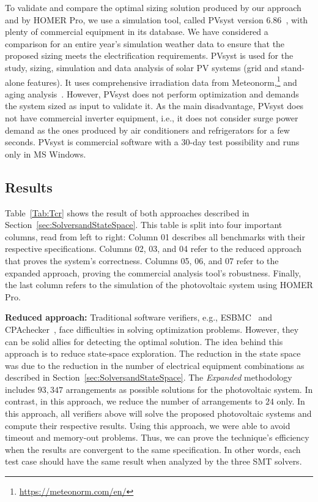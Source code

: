 \documentclass[journal]{IEEEtran}
\begin{document}
To validate and compare the optimal sizing solution produced by our approach and by HOMER Pro, we use a simulation tool, called PVsyst version $6.86$~\cite{PVsyst}, with plenty of commercial equipment in its database. We have considered a comparison for an entire year's simulation weather data to ensure that the proposed sizing meets the electrification requirements. PVsyst is used for the study, sizing, simulation and data analysis of solar PV systems (grid and stand-alone features). It uses comprehensive irradiation data from Meteonorm,\footnote{\href{https://meteonorm.com/en/}{https://meteonorm.com/en/}} and aging analysis~\cite{PVsyst2017}. However, PVsyst does not perform optimization and demands the system sized as input to validate it. As the main disadvantage, PVsyst does not have commercial inverter equipment, i.e., it does not consider surge power demand as the ones produced by air conditioners and refrigerators for a few seconds. PVsyst is commercial software with a $30$-day test possibility and runs only in MS Windows.

\subsection{Results}

Table~\ref{Tab:Tcr} shows the result of both approaches described in Section~\ref{sec:SolversandStateSpace}. This table is split into four important columns, read from left to right: Column 01 describes all benchmarks with their respective specifications. Columns 02, 03, and 04 refer to the reduced approach that proves the system's correctness. Columns 05, 06, and 07 refer to the expanded approach, proving the commercial analysis tool's robustness. Finally, the last column refers to the simulation of the photovoltaic system using HOMER Pro.

\textbf{Reduced approach:} Traditional software verifiers, e.g., ESBMC~\cite{esbmc2018} and CPAchecker~\cite{Beyer2011}, face difficulties in solving optimization problems. However, they can be solid allies for detecting the optimal solution. The idea behind this approach is to reduce state-space exploration. The reduction in the state space was due to the reduction in the number of electrical equipment combinations as described in Section~\ref{sec:SolversandStateSpace}. The \textit{Expanded} methodology includes $93,347$ arrangements as possible solutions for the photovoltaic system.
In contrast, in this approach, we reduce the number of arrangements to $24$ only. In this approach, all verifiers above will solve the proposed photovoltaic systems and compute their respective results. Using this approach, we were able to avoid timeout and memory-out problems. Thus, we can prove the technique's efficiency when the results are convergent to the same specification. In other words, each test case should have the same result when analyzed by the three SMT solvers.
\end{document}
